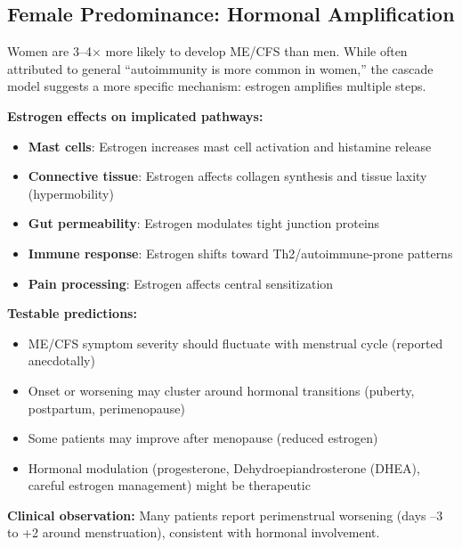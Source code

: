 \subsection{Female Predominance: Hormonal Amplification}
\label{sec:female-predominance}

\begin{hypothesis}
\label{hyp:estrogen-amplifier}
Women are 3--4$\times$ more likely to develop ME/CFS than men. While often attributed to general ``autoimmunity is more common in women,'' the cascade model suggests a more specific mechanism: estrogen amplifies multiple steps.

\textbf{Estrogen effects on implicated pathways:}
\begin{itemize}
    \item \textbf{Mast cells}: Estrogen increases mast cell activation and histamine release
    \item \textbf{Connective tissue}: Estrogen affects collagen synthesis and tissue laxity (hypermobility)
    \item \textbf{Gut permeability}: Estrogen modulates tight junction proteins
    \item \textbf{Immune response}: Estrogen shifts toward Th2/autoimmune-prone patterns
    \item \textbf{Pain processing}: Estrogen affects central sensitization
\end{itemize}

\textbf{Testable predictions:}
\begin{itemize}
    \item ME/CFS symptom severity should fluctuate with menstrual cycle (reported anecdotally)
    \item Onset or worsening may cluster around hormonal transitions (puberty, postpartum, perimenopause)
    \item Some patients may improve after menopause (reduced estrogen)
    \item Hormonal modulation (progesterone, Dehydroepiandrosterone (DHEA), careful estrogen management) might be therapeutic
\end{itemize}

\textbf{Clinical observation:} Many patients report perimenstrual worsening (days --3 to +2 around menstruation), consistent with hormonal involvement.
\end{hypothesis}


